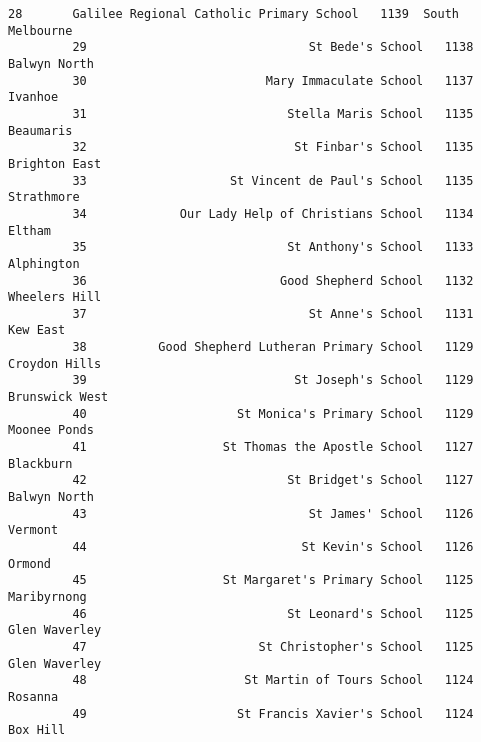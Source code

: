 \documentclass[11pt]{article}
\begin{document}
\begin{Verbatim}[commandchars=\\\{\}]
         28       Galilee Regional Catholic Primary School   1139  South Melbourne   
         29                               St Bede's School   1138     Balwyn North   
         30                         Mary Immaculate School   1137          Ivanhoe   
         31                            Stella Maris School   1135        Beaumaris   
         32                             St Finbar's School   1135    Brighton East   
         33                    St Vincent de Paul's School   1135       Strathmore   
         34             Our Lady Help of Christians School   1134           Eltham   
         35                            St Anthony's School   1133       Alphington   
         36                           Good Shepherd School   1132    Wheelers Hill   
         37                               St Anne's School   1131         Kew East   
         38          Good Shepherd Lutheran Primary School   1129    Croydon Hills   
         39                             St Joseph's School   1129   Brunswick West   
         40                     St Monica's Primary School   1129     Moonee Ponds   
         41                   St Thomas the Apostle School   1127        Blackburn   
         42                            St Bridget's School   1127     Balwyn North   
         43                               St James' School   1126          Vermont   
         44                              St Kevin's School   1126           Ormond   
         45                   St Margaret's Primary School   1125      Maribyrnong   
         46                            St Leonard's School   1125    Glen Waverley   
         47                        St Christopher's School   1125    Glen Waverley   
         48                      St Martin of Tours School   1124          Rosanna   
         49                     St Francis Xavier's School   1124         Box Hill   
         

\end{Verbatim}
\end{document}
